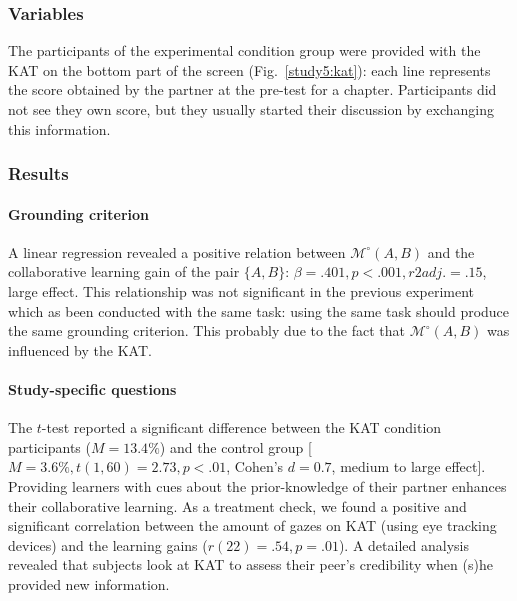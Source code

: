 \documentclass[twocolumn]{article}
\newcommand{\gModel}[2]{{$\mathcal{M}^{\circ}(#1, #2)$}}
\begin{document}
\subsubsection*{Variables}

The participants of the experimental condition group were provided with the KAT
on the bottom part of the screen (Fig.~\ref{study5:kat}): each line represents
the score obtained by the partner at the pre-test for a chapter. Participants
did not see they own score, but they usually started their discussion by
exchanging this information.

\subsubsection*{Results}

\paragraph{Grounding criterion} A linear regression revealed a positive relation
between \gModel{A}{B} and the collaborative learning gain of the pair $\{A,
B\}$: $\beta= .401, p < .001, r2adj. =.15$, large effect. This relationship was
not significant in the previous experiment which as been conducted with the same
task: using the same task should produce the same grounding criterion. This
probably due to the fact that \gModel{A}{B} was influenced by the KAT.

\paragraph{Study-specific questions} The $t$-test reported a significant
difference between the KAT condition participants ($M = 13.4\%$) and the control
group [$M = 3.6\%, t(1, 60) = 2.73, p < .01$, Cohen's $d = 0.7$, medium to large
effect]. Providing learners with cues about the prior-knowledge of their partner
enhances their collaborative learning. As a treatment check, we found a positive
and significant correlation between the amount of gazes on KAT (using eye
tracking devices) and the learning gains ($r(22) = .54, p = .01$). A detailed
analysis revealed that subjects look at KAT to assess their peer's credibility
when (s)he provided new information. 
\end{document}
